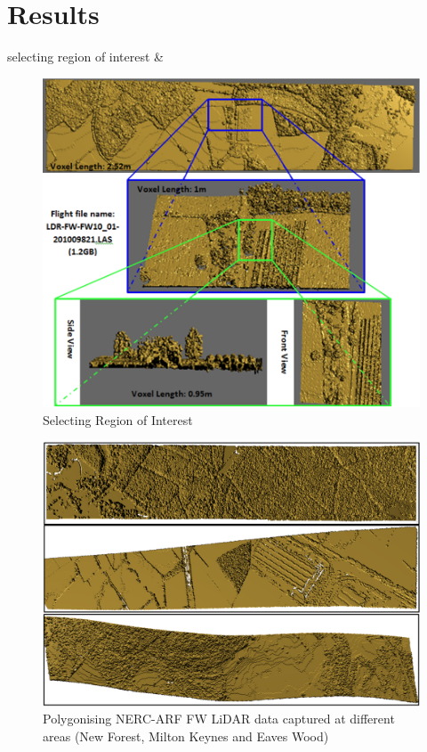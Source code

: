 \documentclass{subfiles}
\begin{document}
\section{Results}\label{sec:MCResults}

 
 selecting region of interest \&
 

 \begin{figure} [h!]
 	\centering
 	\includegraphics[width=.8\textwidth]{img/SelectingRegionOfInterest}
 	\caption[Selecting Region of Interest]{Selecting Region of Interest}
 	\label{fig:SelectingRegionOfInterest}
 \end{figure}
 
 
  \begin{figure} [h!]
  	\centering
  	\includegraphics[width=.8\textwidth]{img/VariousFlightlines}
  	\caption[Various Flightlines Visualisation]{Polygonising NERC-ARF FW LiDAR data captured at different areas (New Forest, Milton Keynes and Eaves Wood)}
  	\label{fig:VariousFlightlines}
  \end{figure}
  
\end{document}
